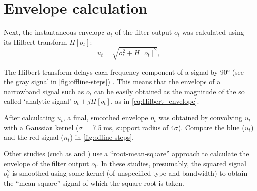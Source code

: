 \section{Envelope calculation}

Next, the instantaneous envelope $u_t$ of the filter output $o_t$ was calculated using its Hilbert transform\footnotemark{} $H[o_t]$:
%
\begin{equation}
\label{eq:Hilbert_envelope}
u_t = \sqrt{o_t^2 + H[o_t]^2},
\end{equation}


The Hilbert transform delays each frequency component of a signal by 90\si{\degree} (see the gray signal in \cref{fig:offline-steps})  \cite{Lyons2010}. This means that the envelope of a narrowband signal such as $o_t$ can be easily obtained as the magnitude of the so called `analytic signal' $o_t + j H[o_t]$, as in \cref{eq:Hilbert_envelope}.\footnotemark{}


After calculating $u_t$, a final, smoothed envelope $n_t$ was obtained by convolving $u_t$ with a Gaussian kernel ($\sigma$ = 7.5 ms, support radius of $4 \sigma$). Compare the blue ($u_t$) and the red signal ($n_t$) in \cref{fig:offline-steps}.

Other studies (such as \cite{Nadasdy1999} and \cite{Csicsvari2000}) use a ``root-mean-square'' approach to calculate the envelope of the filter output $o_t$. In these studies, presumably, the squared signal $o_t^2$ is smoothed using some kernel (of unspecified type and bandwidth) to obtain the ``mean-square'' signal of which the square root is taken.



